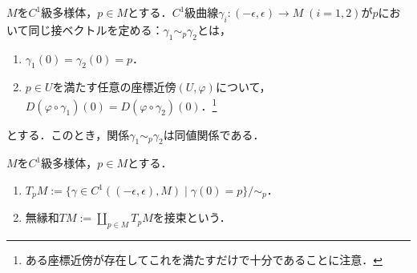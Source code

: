 \documentclass[uplatex,dvipdfmx]{jsreport}
\begin{document}

\begin{lemma}
    $M$を$C^1$級多様体，$p\in M$とする．$C^1$級曲線$\gamma_i:(-\epsilon,\epsilon)\to M\;(i=1,2)$が$p$において同じ接ベクトルを定める：$\gamma_1\sim_p\gamma_2$とは，
    \begin{enumerate}
        \item $\gamma_1(0)=\gamma_2(0)=p$．
        \item $p\in U$を満たす任意の座標近傍$(U,\varphi)$について，$D(\varphi\circ\gamma_1)(0)=D(\varphi\circ\gamma_2)(0)$．\footnote{ある座標近傍が存在してこれを満たすだけで十分であることに注意．}
    \end{enumerate}
    とする．このとき，関係$\gamma_1\sim_p\gamma_2$は同値関係である．
\end{lemma}

\begin{definition}
    $M$を$C^1$級多様体，$p\in M$とする．
    \begin{enumerate}
        \item $T_pM:=\{\gamma\in C^1((-\epsilon,\epsilon),M)\mid\gamma(0)=p\}/\sim_p$．
        \item 無縁和$TM:=\coprod_{p\in M}T_pM$を接束という．
    \end{enumerate}
\end{definition}
\end{document}
